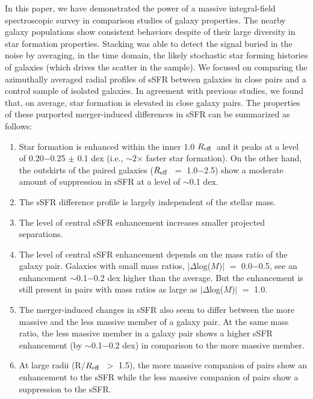 \documentclass[iop,revtex4,twocolumn,apj,numberedappendix,appendixfloats]{emulateapj}
\newcommand{\reff}{$R_{\rm eff}$}
\begin{document}
In this paper, we have demonstrated the power of a massive integral-field spectroscopic survey in comparison studies of galaxy properties. The nearby galaxy populations show consistent behaviors despite of their large diversity in star formation properties. Stacking was able to detect the signal buried in the noise by averaging, in the time domain, the likely stochastic star forming histories of galaxies (which drives the scatter in the sample). We focused on comparing the azimuthally averaged radial profiles of sSFR between galaxies in close pairs and a control sample of isolated galaxies. In agreement with previous studies, we found that, on average, star formation is elevated in close galaxy pairs. The properties of these purported merger-induced differences in sSFR can be summarized as follows:

\begin{enumerate}

\item Star formation is enhanced within the inner 1.0 \reff\ and it peaks at a level of 0.20$-$0.25 $\pm$ 0.1 dex (i.e., $\sim$2$\times$ faster star formation). On the other hand, the outskirts of the paired galaxies (\reff\ $=$ 1.0$-$2.5) show a moderate amount of suppression in sSFR at a level of $\sim$0.1 dex.
 
\item The sSFR difference profile is largely independent of the stellar mass.

\item The level of central sSFR enhancement increases smaller projected separations. 

\item The level of central sSFR enhancement depends on the mass ratio of the galaxy pair. Galaxies with small mass ratios, $|\Delta$log($M$)$|$ $=$ 0.0$-$0.5, see an enhancement $\sim$0.1$-$0.2 dex higher than the average. But the enhancement is still present in pairs with mass ratios as large as $|\Delta$log($M$)$|$ $=$ 1.0. 

\item The merger-induced changes in sSFR also seem to differ between the more massive and the less massive member of a galaxy pair. At the same mass ratio, the less massive member in a galaxy pair shows a higher sSFR enhancement (by $\sim$0.1$-$0.2 dex) in comparison to the more massive member. 

\item At large radii (R/\reff\ $>$ 1.5), the more massive companion of pairs show an enhancement to the sSFR while the less massive companion of pairs show a suppression to the sSFR.

\end{enumerate}
\end{document}
